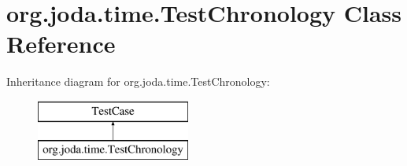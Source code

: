 \hypertarget{classorg_1_1joda_1_1time_1_1_test_chronology}{\section{org.\-joda.\-time.\-Test\-Chronology Class Reference}
\label{classorg_1_1joda_1_1time_1_1_test_chronology}
}
Inheritance diagram for org.\-joda.\-time.\-Test\-Chronology\-:\begin{figure}[H]
\begin{center}
\leavevmode
\includegraphics[height=2.000000cm]{classorg_1_1joda_1_1time_1_1_test_chronology}
\end{center}
\end{figure}
